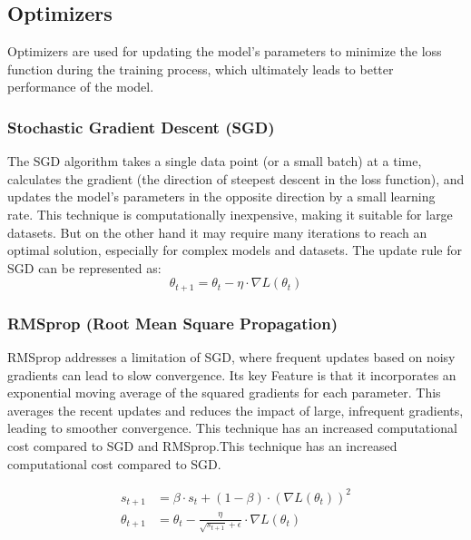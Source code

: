 \documentclass{article}
\begin{document}
\subsection{Optimizers}
Optimizers are used for updating the model's parameters to minimize the loss function during the training process, which ultimately leads to better performance of the model.

\subsubsection{Stochastic Gradient Descent (SGD)}
The SGD algorithm takes a single data point (or a small batch) at a time, calculates the gradient (the direction of steepest descent in the loss function), and updates the model's parameters in the opposite direction by a small learning rate. This technique is computationally inexpensive, making it suitable for large datasets. But on the other hand it may require many iterations to reach an optimal solution, especially for complex models and datasets. The update rule for SGD can be represented as:
$${\theta_{t+1} = \theta_t - \eta \cdot \nabla L(\theta_t)}$$




\subsubsection{RMSprop (Root Mean Square Propagation)}
RMSprop addresses a limitation of SGD, where frequent updates based on noisy gradients can lead to slow convergence.
Its key Feature is that it incorporates an exponential moving average of the squared gradients for each parameter. This averages the recent updates and reduces the impact of large, infrequent gradients, leading to smoother convergence. This technique has an increased computational cost compared to SGD and RMSprop.This technique has an increased computational cost compared to SGD.

\begin{align*}
s_{t+1} & = \beta \cdot s_t + (1 - \beta) \cdot (\nabla L(\theta_t))^2\\
\theta_{t+1} & = \theta_t - \frac{\eta}{\sqrt{s_{t+1}} + \epsilon} \cdot \nabla L(\theta_t)
\end{align*}
\end{document}

